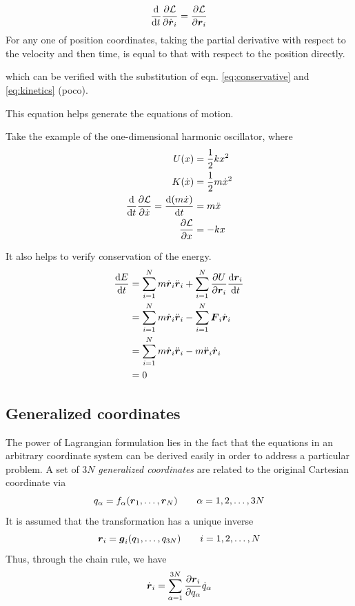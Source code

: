 \begin{tcolorbox}[title={The Euler-Lagrange equation}]
	\begin{equation}
		\dfrac{\mathrm{d} }{\mathrm{d} t}\dfrac{\partial \mathcal{L}}{\partial \dot{\boldsymbol{r}}_i}=\dfrac{\partial \mathcal{L}}{\partial \boldsymbol{r}_i} \label{eq:euler-lagrange}
	\end{equation}
	For any one of position coordinates, taking the partial derivative with respect to the velocity and then time, is equal to that with respect to the position directly.
\end{tcolorbox}
which can be verified with the substitution of eqn. \ref{eq:conservative} and \ref{eq:kinetics} (poco).

This equation helps generate the equations of motion. 

\example
Take the example of the one-dimensional harmonic oscillator, where
\begin{align*}
	U(x)&=\dfrac{1}{2} kx^2\\
	K(\dot{x})&=\dfrac{1}{2} m\dot{x}^2\\
	\dfrac{\mathrm{d} }{\mathrm{d} t}\dfrac{\partial \mathcal{L}}{\partial \dot{x}}=\dfrac{\mathrm{d} (m\dot{x})}{\mathrm{d} t}&=m\ddot{x}\\
	\dfrac{\partial \mathcal{L}}{\partial x}&=-kx
\end{align*}

It also helps to verify conservation of the energy.
\begin{align*}
	\dfrac{\mathrm{d} E}{\mathrm{d} t}&=\sum_{i=1}^N m\dot{\boldsymbol{r}}_i\ddot{\boldsymbol{r}}_i+\sum_{i=1}^N\dfrac{\partial U}{\partial \boldsymbol{r}_i}\dfrac{\mathrm{d} \boldsymbol{r}_i}{\mathrm{d} t}\\
	&=\sum_{i=1}^N m\dot{\boldsymbol{r}}_i\ddot{\boldsymbol{r}}_i-\sum_{i=1}^N\boldsymbol{F}_i\dot{\boldsymbol{r}}_i\\
	&=\sum_{i=1}^N m\dot{\boldsymbol{r}}_i\ddot{\boldsymbol{r}}_i-m\ddot{\boldsymbol{r}}_i\dot{\boldsymbol{r}}_i\\
	&=0
\end{align*}

\subsection{Generalized coordinates}
The power of Lagrangian formulation lies in the fact that the equations in an arbitrary coordinate system can be derived easily in order to address a particular problem. A set of $3N$ \textit{generalized coordinates} are related to the original Cartesian coordinate via
\begin{equation}
	q_\alpha = f_\alpha(\boldsymbol{r}_1,\dots,\boldsymbol{r}_N)\qquad \alpha=1,2,\dots,3N
\end{equation}
It is assumed that the transformation has a unique inverse
\begin{equation}
	\boldsymbol{r}_i=\boldsymbol{g}_i(q_1,\dots,q_{3N})\qquad i=1,2,\dots,N
\end{equation}
Thus, through the chain rule, we have
\begin{equation}
	\dot{\boldsymbol{r}}_i=\sum_{\alpha=1}^{3N}\dfrac{\partial \boldsymbol{r}_i}{\partial q_\alpha}\dot{q}_\alpha
\end{equation}

